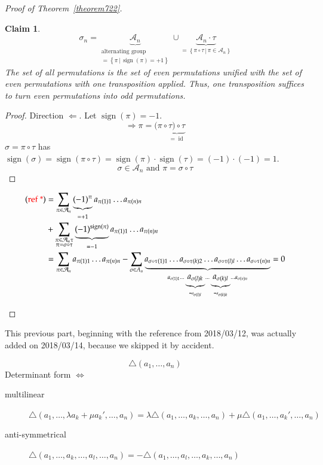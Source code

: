 \documentclass[a4paper]{article}
\numberwithin{lecref}{section}
\newtheorem*{claim}{Claim}
\newcommand{\setdef}[2]{\left\{\left.#1\,\right|\,#2\right\}}
\DeclareMathOperator{\sign}{sign}
\begin{document}
\begin{proof}[Proof of Theorem~\ref{theorem722}]
\begin{enumerate}
\begin{claim}
        \[ \sigma_n = \underbrace{\mathcal A_n}_{\substack{\text{alternating group} \\ = \setdef{\pi}{\sign(\pi) = +1}}} \cup \underbrace{\mathcal A_{n} \cdot \tau}_{= \setdef{\pi \circ \tau}{\pi \in \mathcal A_n}} \]
        The set of all permutations is the set of even permutations unified with the set of even permutations with one transposition applied. Thus, one transposition suffices to turn even permutations into odd permutations.
      \end{claim}
      \begin{proof}
        Direction $\Leftarrow$.
        Let $\sign(\pi) = -1$.
        \[ \Rightarrow \pi = (\pi \circ \underbrace{\tau) \circ \tau}_{= \operatorname{id}} \]
        $\sigma = \pi \circ \tau$ has $\sign(\sigma) = \sign(\pi \circ \tau) = \sign(\pi) \cdot \sign(\tau) = (-1) \cdot (-1) = 1$.
        \[ \sigma \in \mathcal A_n \text{ and } \pi = \sigma \circ \tau \]
      \end{proof}
      \begin{align*}
        \text{({\color{red} ref *})} &= \sum_{\pi \in \mathcal A_n} \underbrace{(-1)^\pi}_{=+1} a_{\pi(1) 1} \dots a_{\pi(n) n} \\
          &+ \sum_{\substack{\pi \in \mathcal A_n \tau \\ \pi = \sigma \circ \tau}} \underbrace{(-1)^{\sign(\pi)}}_{= -1} a_{\pi(1) 1} \dots a_{\pi(n) n} \\
          &= \sum_{\pi \in \mathcal A_n} a_{\pi(1) 1} \dots a_{\pi(n) n} - \sum_{\sigma \in A_n} \underbrace{
            a_{\sigma \circ \tau(1) 1} \dots a_{\sigma \circ \tau(k) 2} \dots a_{\sigma \circ \tau(l) l} \dots a_{\sigma \circ \tau(n) n}
          }_{
            a_{\sigma(1) 1} \dots \underbrace{a_{\sigma(l) k}}_{=a_{\sigma(l) l}} \dots \underbrace{a_{\sigma(k) l}}_{= a_{\sigma(k) k}} \dots a_{\sigma(n) n}
          } = 0
      \end{align*}
  \end{enumerate}
\end{proof}

This previous part, beginning with the reference from 2018/03/12, was actually added on 2018/03/14, because we skipped it by accident.

\[ \triangle(a_1, \dots, a_n) \]
Determinant form $\iff$
\begin{description}
  \item[multilinear] $\triangle(a_1, \dots, \lambda a_k + \mu a_k', \dots, a_n) = \lambda \triangle(a_1, \dots, a_k, \dots, a_n) + \mu \triangle(a_1, \dots, a_k', \dots, a_n)$
  \item[anti-symmetrical] $\triangle(a_1, \dots, a_k, \dots, a_l, \dots, a_n) = -\triangle(a_1, \dots, a_l, \dots, a_k, \dots, a_n)$
\end{description}
\end{document}
